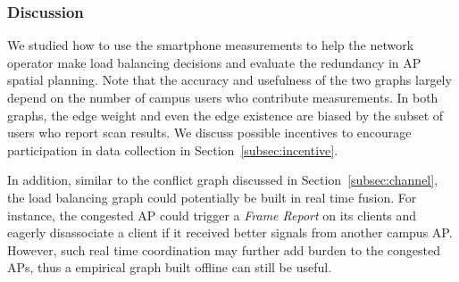 \subsubsection{Discussion}

We studied how to use the smartphone measurements to help the network operator
make load balancing decisions and evaluate the redundancy in AP spatial
planning. Note that the accuracy and usefulness of the two graphs largely depend
on the number of campus \wifi{} users who contribute measurements. In both
graphs, the edge weight and even the edge existence are biased by the subset of
users who report scan results. We discuss possible incentives to encourage
participation in data collection in Section~\ref{subsec:incentive}.

In addition, similar to the conflict graph discussed in
Section~\ref{subsec:channel}, the load balancing graph could potentially be built
in real time fusion. For instance, the congested AP could trigger a \textit{Frame
Report} on its clients and eagerly disassociate a client if it received better
signals from another campus AP. However, such real time coordination may further
add burden to the congested APs, thus a empirical graph built offline can still
be useful.
